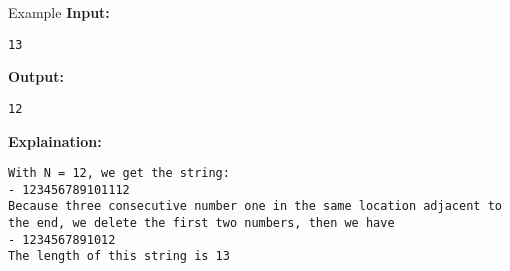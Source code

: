 Example
\textbf{    Input:   }
\begin{verbatim}
13\end{verbatim}

\textbf{    Output:   }
\begin{verbatim}
12\end{verbatim}

\textbf{    Explaination:   }
\begin{verbatim}
With N = 12, we get the string:
- 123456789101112
Because three consecutive number one in the same location adjacent to the end, we delete the first two numbers, then we have
- 1234567891012
The length of this string is 13\end{verbatim}